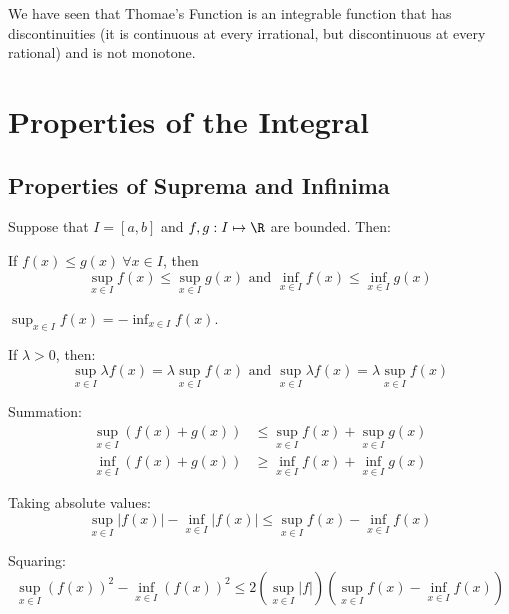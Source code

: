 \documentclass[../Main.tex]{subfiles}
\begin{document}
\begin{remark}
    We have seen that Thomae's Function is an integrable function that has discontinuities (it is continuous at every irrational, but discontinuous at every rational) and is not monotone.
\end{remark}
\section{Properties of the Integral}
\subsection{Properties of Suprema and Infinima}
\begin{propositions}{
        Suppose that $I = [a, b]$ and $f, g : I \mapsto \R$ are bounded. Then:
        \label{propsSupremumProps}
    }   
    \item If $f(x) \leq g(x)~\forall x \in I$, then
        \begin{equation*}
            \sup_{x \in I} f(x) \leq \sup_{x \in I} g(x) \text{ and } \inf_{x \in I} f(x) \leq \inf_{x \in I} g(x)
        \end{equation*}
        \label{propSupPreservesOrdering}
    \item $\sup_{x \in I} f(x) = -\inf_{x \in I} f(x)$. \label{propSupOfNegative}
    \item If $\lambda > 0$, then:
        \begin{equation*}
            \sup_{x \in I} \lambda f(x) = \lambda \sup_{x \in I} f(x) \text{ and } \sup_{x \in I} \lambda f(x) = \lambda \sup_{x \in I} f(x)
        \end{equation*}
        \label{propSupConstant}
    \item Summation:
        \begin{align*}
            \sup_{x \in I} (f(x) + g(x)) &\leq \sup_{x \in I} f(x) + \sup_{x \in I} g(x) \\
            \inf_{x \in I} (f(x) + g(x)) &\geq \inf_{x \in I} f(x) + \inf_{x \in I} g(x)
        \end{align*}
        \label{propSupSum}
    \item Taking absolute values:
        \begin{equation*}
            \sup_{x \in I} |f(x)| - \inf_{x \in I} |f(x)| \leq \sup_{x \in I} f(x) - \inf_{x \in I} f(x)
        \end{equation*}
        \label{propSupAbs}
    \item Squaring:
        \begin{equation*}
            \sup_{x \in I} (f(x))^2 - \inf_{x \in I} (f(x))^2 \leq 2 \left(\sup_{x \in I} |f|\right) \left(\sup_{x \in I} f(x) - \inf_{x \in I} f(x) \right)
        \end{equation*}
        \label{propSupSquare}
\end{propositions}
\end{document}
